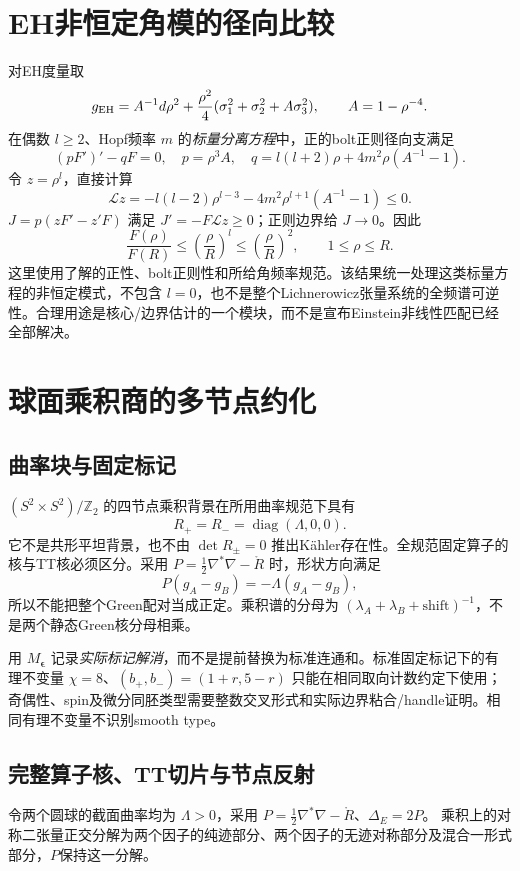 \documentclass[UTF8,a4paper,11pt,fontset=fandol]{ctexart}
\numberwithin{equation}{section}
\theoremstyle{definition}
\newcommand{\Z}{\mathbb Z}
\begin{document}
\section{EH非恒定角模的径向比较}
对EH度量取
\[
g_{\rm EH}=A^{-1}d\rho^2+\frac{\rho^2}{4}
(\sigma_1^2+\sigma_2^2+A\sigma_3^2),\qquad A=1-\rho^{-4}.
\]
在偶数 $l\ge2$、Hopf频率 $m$ 的\emph{标量分离方程}中，正的bolt正则径向支满足
\[
(pF')'-qF=0,\quad p=\rho^3A,\quad
q=l(l+2)\rho+4m^2\rho(A^{-1}-1).
\]
令 $z=\rho^l$，直接计算
\[
\mathcal Lz=-l(l-2)\rho^{l-3}-4m^2\rho^{l+1}(A^{-1}-1)\le0.
\]
$J=p(zF'-z'F)$ 满足 $J'=-F\mathcal Lz\ge0$；正则边界给 $J\to0$。因此
\begin{equation}\label{eq:angular}
\frac{F(\rho)}{F(R)}\le\left(\frac{\rho}{R}\right)^l
\le\left(\frac{\rho}{R}\right)^2,\qquad1\le\rho\le R.
\end{equation}
这里使用了解的正性、bolt正则性和所给角频率规范。该结果统一处理这类标量方程的非恒定模式，不包含 $l=0$，也不是整个Lichnerowicz张量系统的全频谱可逆性。合理用途是核心/边界估计的一个模块，而不是宣布Einstein非线性匹配已经全部解决。

\section{球面乘积商的多节点约化}
\subsection{曲率块与固定标记}
$(S^2\times S^2)/\Z_2$ 的四节点乘积背景在所用曲率规范下具有
\[
R_+=R_-=\operatorname{diag}(\Lambda,0,0).
\]
它不是共形平坦背景，也不由 $\det R_\pm=0$ 推出K\"ahler存在性。全规范固定算子的核与TT核必须区分。采用 $P=\frac12\nabla^*\nabla-\mathring R$ 时，形状方向满足
\[
P(g_A-g_B)=-\Lambda(g_A-g_B),
\]
所以不能把整个Green配对当成正定。乘积谱的分母为 $(\lambda_A+\lambda_B+\text{shift})^{-1}$，不是两个静态Green核分母相乘。

用 $M_{\boldsymbol\epsilon}$ 记录\emph{实际标记解消}，而不是提前替换为标准连通和。标准固定标记下的有理不变量 $\chi=8$、$(b_+,b_-)=(1+r,5-r)$ 只能在相同取向计数约定下使用；奇偶性、spin及微分同胚类型需要整数交叉形式和实际边界粘合/handle证明。相同有理不变量不识别smooth type。

\subsection{完整算子核、TT切片与节点反射}\label{sec:fullkernel}
令两个圆球的截面曲率均为 $\Lambda>0$，采用
$P=\frac12\nabla^*\nabla-\mathring R$、$\Delta_E=2P$。
乘积上的对称二张量正交分解为两个因子的纯迹部分、两个因子的无迹对称部分及混合一形式部分，$P$保持这一分解。
\end{document}
